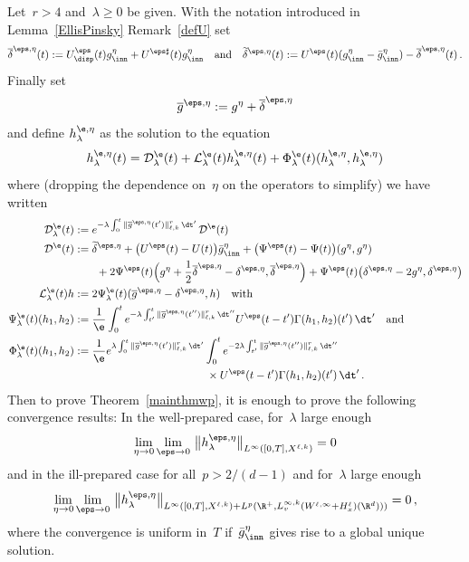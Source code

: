 \begin{lemm}\label{lem:reduction}
Let~$r >4$ and~$\lambda \geq 0$ be given. With the notation introduced in Lemma~\ref{EllisPinsky} Remark~\ref{defU} set
\[
\overline\delta^{\eps,\eta} (t) :=U^\eps_{\disp}(t) g^\eta_{\inn} + U^{\eps \sharp}(t)g^\eta_{\inn} \quad \text{and}\quad\widetilde \delta^{\eps,\eta} (t) := U^\eps(t) (g_{\inn}^\eta - \bar g^\eta_{\inn}) - \overline\delta^{\eps,\eta} (t) \,.
\]
Finally set
\[
\overline g^{\eps,\eta}:=g^\eta + \overline\delta^{\eps,\eta}
\]
and define $h^{\e,\eta}_\lambda$ as the solution to the equation
\begin{equation}\label{equationhepsetalambda}
h^{\e,\eta}_\lambda(t) = \mathcal{D}_\lambda^{\e}(t) + \mathcal{L}_\lambda^{\e}(t) h^{\e,\eta}_\lambda(t) + \Phi^\e_\lambda(t) (h^{\e,\eta}_\lambda,h^{\e,\eta}_\lambda)
\end{equation}
where (dropping the dependence on~$\eta$ on the operators to simplify) we have written
\begin{equation}\label{defopslambda}
\begin{aligned}
\mathcal{D}_\lambda^\e (t) & := e^{-\lambda \int_0^t \|\overline g^{\eps,\eta}(t')\|_{\ell,k}^r\, \dt' \, } \mathcal{D}^\e (t) \\
\mathcal{D}^\e (t) & := \widetilde \delta^{\eps,\eta} + \big(U^\eps (t) - U (t)\big)\bar g^\eta_{\inn} + \big(\Psi^\eps (t) - \Psi(t) \big) (g^\eta,g^\eta)
\\
& \qquad + 2 \Psi^\eps (t) \Big({g^\eta+\frac 12 \overline\delta^{\eps,\eta}}- \delta^{\eps,\eta}, \overline\delta^{\eps,\eta}\Big) +\Psi^\eps (t)
\big(\delta^{\eps,\eta} -2g^\eta, \delta^{\eps,\eta} \big) \\
\mathcal{L}^\e _\lambda (t) h& := 2\Psi_\lambda^{\e}(t) (\overline g^{\eps,\eta}- \delta^{\eps,\eta},h) \quad\text{with} \\
\Psi_\lambda^{\e }(t) (h_1,h_2) &:=\frac1\e
\int_0^t e^{- \lambda \int_{t'}^t \|\overline g^{\eps,\eta}(t'')\|_{\ell,k}^r\, \dt'' } U^\eps(t-t')\Gamma (h_1,h_2) (t')\, \dt' \quad \text{and}
\\
\Phi_\lambda^{\e }(t) (h_1,h_2) &:=\frac1\e e^{\lambda \int_0^t \|\overline g^{\eps,\eta}(t')\|_{\ell,k}^r\, \dt' }
\int_0^t e^{-2\lambda \int_{t'}^t \|\overline g^{\eps,\eta}(t'')\|_{\ell,k}^r\, \dt'' } \\
&\qquad\qquad\qquad\qquad\qquad\qquad\times U^\eps(t-t')\Gamma (h_1,h_2) (t')\, \dt'
\,.
\end{aligned}
\end{equation}
Then to prove Theorem~\ref{mainthmwp}, it is enough to prove the following convergence results: In the well-prepared case, for~$\lambda$ large enough
\[
\lim_{\eta\to 0} \lim_{\eps\to 0} \, \big\| h^{\eps,\eta}_\lambda
\big\|_{L^\infty([0,T],X^{\ell,k})} = 0
\]
and in the ill-prepared case for all~$p>2/(d-1)$ and for~$\lambda$ large enough
\[
\lim_{\eta\to 0} \lim_{\eps\to 0} \, \big\| h^{\eps,\eta}_\lambda
\big\|_{L^\infty([0,T],X^{\ell,k})+ {L^p(\R^+,L^{\infty,k}_v(W^{\ell,\infty}{+ H^\ell_x})(\R^d)))}} = 0 \,,
\]
where the convergence is uniform in~$T$ if~$\bar g_{\inn}^\eta$ gives rise to a global unique solution.
\end{lemm}
